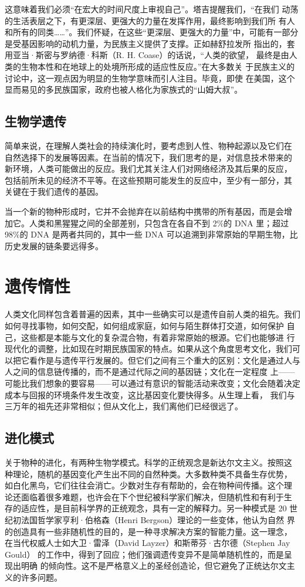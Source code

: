 这意味着我们必须“在宏大的时间尺度上审视自己”。塔吉提醒我们，“在我们 动荡的生活表层之下，有更深层、更强大的力量在发挥作用，最终影响到我们所 有人和所有的同类……”。我们怀疑，在这些“更深层、更强大的力量”中，可能有一部分是受基因影响的动机力量，为民族主义提供了支撑。正如赫舒拉发所 指出的，套用亚当·斯密与罗纳德·科斯（R. H. Coase）的话说，“人类的欲望， 最终是由人类的生物本性和在地球上的处境所形成的适应性反应。”在大多数关 于民族主义的讨论中，这一观点因为明显的生物学意味而引人注目。毕竟，即使 在美国，这个显而易见的多民族国家，政府也被人格化为家族式的“山姆大叔”。

\subsection{生物学遗传}
简单来说，在理解人类社会的持续演化时，要考虑到人性、物种起源以及它们在 自然选择下的发展等因素。在当前的情况下，我们思考的是，对信息技术带来的 新环境，人类可能做出的反应。我们尤其关注人们对网络经济及其后果的反应， 包括前所未见的经济不平等。在这些预期可能发生的反应中，至少有一部分，其 关键在于我们遗传的基因。

当一个新的物种形成时，它并不会抛弃在以前结构中携带的所有基因，而是会增 加它。人类和黑猩猩之间的全部差别，只包含在各自不到 2\%的 DNA 里；超过 98\%的 DNA 是两者共同的，其中一些 DNA 可以追溯到非常原始的早期生物，比 历史发展的链条要远得多。

\section{遗传惰性}

人类文化同样包含着普遍的因素，其中一些确实可以是遗传自前人类的祖先。我们如何寻找事物，如何交配，如何组成家庭，如何与陌生群体打交道，如何保护 自己，这些都是本能与文化的复杂混合物，有着非常原始的根源。它们也能够进 行现代化的调整，比如现在时期民族国家的特点。如果从这个角度思考文化，我们可以把它看作是与遗传平行发展的。但它们之间有三个重大的区别：文化是通过人与人之间的信息链传播的，而不是通过代际之间的基因链；文化在一定程度 上——可能比我们想象的要容易——可以通过有意识的智能活动来改变；文化会随着决定成本与回报的环境条件发生改变，这比基因变化要快得多。从生理上看， 我们与三万年的祖先还非常相似；但从文化上，我们离他们已经很远了。

\subsection{进化模式}

关于物种的进化，有两种生物学模式。科学的正统观念是新达尔文主义。按照这 种理论，随机的基因变化产生出不同的自然种类。大多数种类不具备生存优势， 如白化黑鸟，它们往往会消亡。少数对生存有帮助的，会在物种间传播。这个理 论还面临着很多难题，也许会在下个世纪被科学家们解决，但随机性和有利于生 存的适应性，是目前科学界的正统观念，具有一定的解释力。另一种模式是 20  世纪初法国哲学家亨利·伯格森（Henri Bergson）理论的一些变体，他认为自然 界的创造具有一些非随机性的目的，是一种寻求解决方案的智能力量。这一理念， 在当代权威人士如大卫·雷泽（David Layzer）和斯蒂芬·古尔德（Stephen Jay Gould） 的工作中，得到了回应；他们强调遗传变异不是简单随机性的，而是呈现出明确 的倾向性。这不是严格意义上的圣经创造论，但它避免了正统达尔文主义的许多问题。

